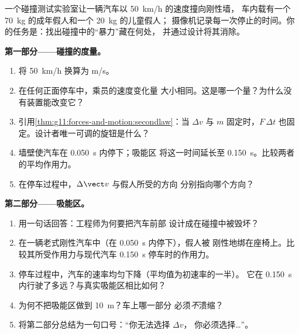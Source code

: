 \begin{problem}
\label{pb:g11:forces-and-motion:1}
一个碰撞测试实验室让一辆汽车以 \qty{50}{km/h} 的速度撞向刚性墙，
车内载有一个 \qty{70}{kg} 的成年假人和一个 \qty{20}{kg} 的儿童假人；
摄像机记录每一次停止的时间。你的任务是：找出碰撞中的“暴力”藏在何处，
并通过设计将其消除。

\medskip
\noindent\textbf{第一部分——碰撞的度量。}
\begin{enumerate}
  \item 将 \qty{50}{km/h} 换算为 \unit{m/s}。
  \item 在任何正面停车中，乘员的速度变化量
        大小相同。这是哪一个量？为什么没有装置能改变它？
  \item 引用\cref{thm:g11:forces-and-motion:secondlaw}：当 $\Delta v$
        与 $m$ 固定时，$F\,\Delta t$ 也固定。设计者唯一可调的旋钮是什么？
  \item 墙壁使汽车在 \qty{0.050}{s} 内停下；吸能区
        将这一时间延长至 \qty{0.150}{s}。比较两者的平均作用力。
  \item 在停车过程中，$\Delta \vect v$ 与假人所受的方向
        分别指向哪个方向？
\end{enumerate}

\medskip
\noindent\textbf{第二部分——吸能区。}
\begin{enumerate}[resume]
  \item 用一句话回答：工程师为何要把汽车前部
        设计成在碰撞中被毁坏？
  \item 在一辆老式刚性汽车中（在 \qty{0.050}{s} 内停下），假人被
        刚性地绑在座椅上。比较其所受作用力与现代汽车 \qty{0.150}{s} 停车时的作用力。
  \item 停车过程中，汽车的速率均匀下降（平均值为初速率的一半）。
        它在 \qty{0.150}{s} 内行驶了多远？与真实吸能区相比如何？
  \item 为何不把吸能区做到 \qty{10}{m}？车上哪一部分
        必须\emph{不}溃缩？
  \item 将第二部分总结为一句口号：“你无法选择 $\Delta v$，
        你必须选择\dots”。
\end{enumerate}


\end{problem}
